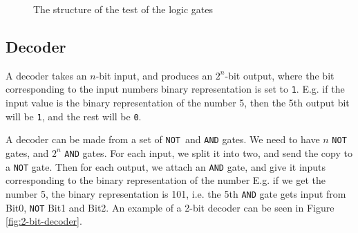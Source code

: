 \begin{figure}
    \centering
    \caption{The structure of the test of the logic gates}
    \label{fig:logic-test}
\end{figure}

\subsection{Decoder}
A decoder takes an $n$-bit input, and produces an $2^n$-bit output, where the
bit corresponding to the input numbers binary representation is set to
\texttt{1}. E.g. if the input value is the binary representation of the number
5, then the 5th output bit will be \texttt{1}, and the rest will be \texttt{0}.

A decoder can be made from a set of \texttt{NOT} and \texttt{AND} gates. We
need to have $n$ \texttt{NOT} gates, and $2^n$ \texttt{AND} gates. For each
input, we split it into two, and send the copy to a \texttt{NOT} gate. Then for
each output, we attach an \texttt{AND} gate, and give it inputs corresponding
to the binary representation of the number %
E.g. if we get the number 5, the binary representation is 101, i.e. the 5th
\texttt{AND} gate gets input from Bit0, \texttt{NOT} Bit1 and Bit2. An example
of a 2-bit decoder can be seen in Figure \ref{fig:2-bit-decoder}.

